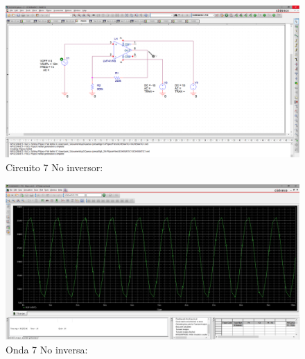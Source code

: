 \documentclass[letterpaper]{article}
\begin{document}
\begin{figure}[htbp]
    \centering
    \includegraphics[width=18cm]{IMG/cir(6).png}
    \caption{Circuito 7 No inversor:}
    \label{fig:my_label}
\end{figure}
\begin{figure}[htbp]
    \centering
    \includegraphics[width=18cm]{IMG/ond(5).png}
    \caption{Onda 7 No inversa: }
    \label{fig:my_label}
\end{figure}
\end{document}
